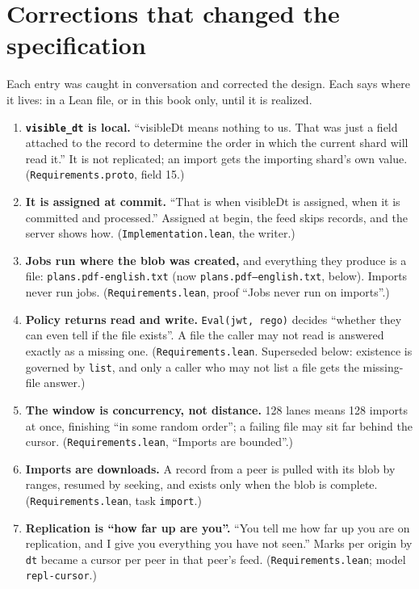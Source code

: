 \section{Corrections that changed the specification}
Each entry was caught in conversation and corrected the design. Each says
where it lives: in a Lean file, or in this book only, until it is realized.
\begin{enumerate}\tightlist
\item \textbf{\texttt{visible\_dt} is local.} ``visibleDt means nothing to us. That
  was just a field attached to the record to determine the order in which the
  current shard will read it.'' It is not replicated; an import gets the importing
  shard's own value. (\texttt{Requirements.proto}, field 15.)
\item \textbf{It is assigned at commit.} ``That is when visibleDt is assigned, when
  it is committed and processed.'' Assigned at begin, the feed skips records, and
  the server shows how. (\texttt{Implementation.lean}, the writer.)
\item \textbf{Jobs run where the blob was created,} and everything they produce is
  a file: \texttt{plans.pdf-english.txt} (now \texttt{plans.pdf--english.txt},
  below). Imports never run jobs.
  (\texttt{Requirements.lean}, proof ``Jobs never run on imports''.)
\item \textbf{Policy returns read and write.} \texttt{Eval(jwt, rego)} decides
  ``whether they can even tell if the file exists''. A file the caller may not
  read is answered exactly as a missing one. (\texttt{Requirements.lean}.
  Superseded below: existence is governed by \texttt{list}, and only a caller
  who may not list a file gets the missing-file answer.)
\item \textbf{The window is concurrency, not distance.} 128 lanes means 128
  imports at once, finishing ``in some random order''; a failing file may sit far
  behind the cursor. (\texttt{Requirements.lean}, ``Imports are bounded''.)
\item \textbf{Imports are downloads.} A record from a peer is pulled with its blob
  by ranges, resumed by seeking, and exists only when the blob is complete.
  (\texttt{Requirements.lean}, task \texttt{import}.)
\item \textbf{Replication is ``how far up are you''.} ``You tell me how far up you
  are on replication, and I give you everything you have not seen.'' Marks per
  origin by \texttt{dt} became a cursor per peer in that peer's feed.
  (\texttt{Requirements.lean}; model \texttt{repl-cursor}.)

\end{enumerate}
